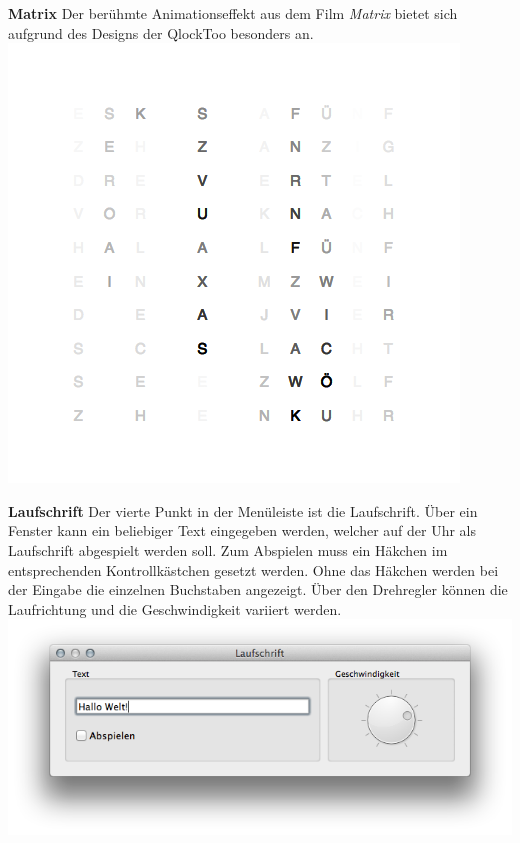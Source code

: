 \begin{multicols}{2}
\textbf{Matrix}
Der berühmte Animationseffekt aus dem Film \emph{Matrix} bietet sich aufgrund des Designs der QlockToo besonders an.
\includegraphics[width=\columnwidth]{Abbildungen/Software/Demo/Matrix}

\textbf{Laufschrift}
Der vierte Punkt in der Menüleiste ist die Laufschrift. Über ein Fenster kann ein beliebiger Text eingegeben werden, welcher auf der Uhr als Laufschrift abgespielt werden soll. Zum Abspielen muss ein Häkchen im entsprechenden Kontrollkästchen gesetzt werden.
Ohne das Häkchen werden bei der Eingabe die einzelnen Buchstaben angezeigt. Über den Drehregler können die Laufrichtung und die Geschwindigkeit variiert werden.
\includegraphics[width=1\columnwidth]{Abbildungen/Software/Laufschrift}

\end{multicols}
